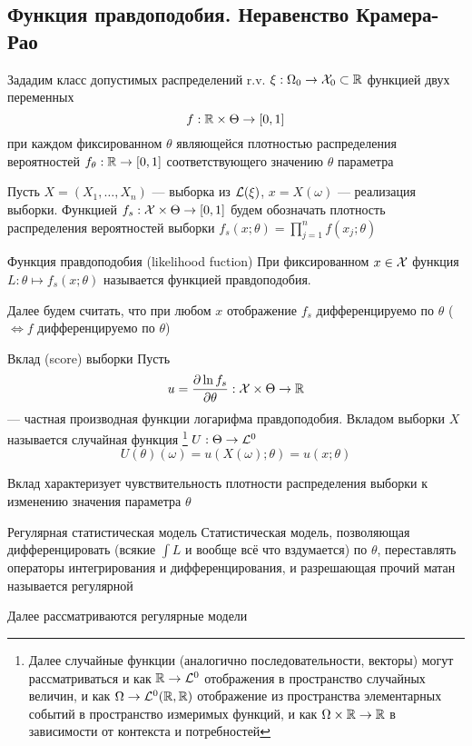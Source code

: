 \subsection{Функция правдоподобия. Неравенство {Крамера-Рао}}

Зададим класс допустимых распределений r.v. $\xi:\Omega_0\to\mathcal X_0\subset\mathbb R$
функцией двух переменных $$f: \mathbb R\times\Theta\to\left[{0, 1}\right]$$
при каждом фиксированном $\theta$ являющейся
плотностью распределения вероятностей $f_\theta: \mathbb R\to\left[{0, 1}\right]$
соответствующего значению $\theta$ параметра

Пусть $X = (X_1, \dotsc, X_n)$ --- выборка из $\mathcal L(\xi)$,
$x = X(\omega)$ --- реализация выборки.
Функцией $f_s:\mathcal X\times\Theta\to\left[{0, 1}\right]$
будем обозначать плотность распределения вероятностей выборки
$f_s(x; \theta) = \prod_{j=1}^n f(x_j; \theta)$

\begin{dfn}{Функция правдоподобия (likelihood fuction)}
При фиксированном $x\in\mathcal X$
функция $L: \theta\mapsto f_s(x;\theta)$ называется функцией правдоподобия.

Далее будем считать,
что при любом $x$
отображение $f_s$ дифференцируемо по $\theta$ ($\iff f$ дифференцируемо по $\theta$)
\end{dfn}

\begin{dfn}{Вклад (score) выборки}
Пусть $$u = \frac{\partial\ln f_s}{\partial\theta}:\mathcal X\times\Theta\to\mathbb R$$
--- частная производная функции логарифма правдоподобия.
Вкладом выборки $X$
называется случайная функция%
\footnote{Далее случайные функции (аналогично последовательности, векторы)
могут рассматриваться
и как $\mathbb R\to\mathcal L^{0}$ отображения в пространство случайных величин,
и как $\Omega\to\mathcal L^{0}(\mathbb R,\mathbb R)$
отображение из пространства элементарных событий в пространство измеримых функций,
и как $\Omega\times\mathbb R\to\mathbb R$
в зависимости от контекста и потребностей}
$U:\Theta\to\mathcal L^{0}$
$$U(\theta)(\omega) = u(X(\omega);\theta) = u(x;\theta)$$

Вклад характеризует чувствительность плотности распределения выборки
к изменению значения параметра $\theta$
\end{dfn}

\begin{dfn}{Регулярная статистическая модель}
Статистическая модель,
позволяющая
дифференцировать (всякие $\int L$ и вообще всё что вздумается) по $\theta$,
переставлять операторы интегрирования и дифференцирования,
и разрешающая прочий матан называется регулярной

Далее рассматриваются регулярные модели
\end{dfn}

